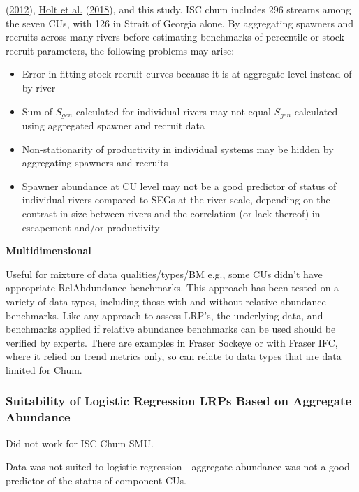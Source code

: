 \documentclass[11pt]{book}
\begin{document}
(\protect\hyperlink{ref-hilbornBritishColumbiaChum2012}{2012}), \protect\hyperlink{ref-holtEvaluatingBenchmarksBiological2018}{Holt et al.} (\protect\hyperlink{ref-holtEvaluatingBenchmarksBiological2018}{2018}), and this study. ISC chum includes 296 streams among the seven CUs, with 126 in Strait of Georgia alone. By aggregating spawners and recruits across many rivers before estimating benchmarks of percentile or stock-recruit parameters, the following problems may arise:
\begin{itemize}

\item
  Error in fitting stock-recruit curves because it is at aggregate level instead of by river
\item
  Sum of \(S_{gen}\) calculated for individual rivers may not equal \(S_{gen}\) calculated using aggregated spawner and recruit data
\item
  Non-stationarity of productivity in individual systems may be hidden by aggregating spawners and recruits
\item
  Spawner abundance at CU level may not be a good predictor of status of individual rivers compared to SEGs at the river scale, depending on the contrast in size between rivers and the correlation (or lack thereof) in escapement and/or productivity
\end{itemize}
\textbf{Multidimensional}

Useful for mixture of data qualities/types/BM e.g., some CUs didn't have appropriate RelAbdundance benchmarks. This approach has been tested on a variety of data types, including those with and without relative abundance benchmarks. Like any approach to assess LRP's, the underlying data, and benchmarks applied if relative abundance benchmarks can be used should be verified by experts. There are examples in Fraser Sockeye or with Fraser IFC, where it relied on trend metrics only, so can relate to data types that are data limited for Chum.

\hypertarget{suitability-of-logistic-regression-lrps-based-on-aggregate-abundance}{%
\subsubsection{Suitability of Logistic Regression LRPs Based on Aggregate Abundance}\label{suitability-of-logistic-regression-lrps-based-on-aggregate-abundance}}

Did not work for ISC Chum SMU.

Data was not suited to logistic regression - aggregate abundance was not a good predictor of the status of component CUs.
\end{document}
